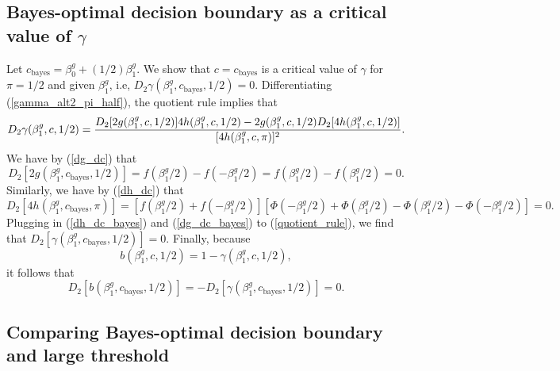 \documentclass[11pt]{article}
\begin{document}
\begin{appendices}
\begin{refsection}
\subsection{Bayes-optimal decision boundary as a critical value of $\gamma$}\label{sec:bayes_opt}
Let $c_\textrm{bayes} = \beta^g_0 + (1/2)\beta^g_1.$ We show that $c = c_\textrm{bayes}$ is a critical value of $\gamma$ for $\pi = 1/2$ and given $\beta^g_1$, i.e, $D_2 \gamma (\beta^g_1, c_\textrm{bayes}, 1/2) = 0.$ Differentiating (\ref{gamma_alt2_pi_half}), the quotient rule implies that
\begin{equation}\label{quotient_rule}
D_2\gamma(\beta^g_1, c, 1/2) \\ = \frac{D_2[2g(\beta^g_1, c, 1/2)] 4h(\beta^g_1, c, 1/2) - 2g(\beta^g_1, c, 1/2) D_2[4h(\beta^g_1, c, 1/2)]}{[4h(\beta^g_1, c, \pi)]^2}.
\end{equation}
We have by (\ref{dg_dc}) that
\begin{equation}\label{dg_dc_bayes}
D_2[2g(\beta^g_1, c_\textrm{bayes}, 1/2)] = f( \beta^g_1/2) - f( -\beta^g_1/2) = f(\beta^g_1/2) - f(\beta^g_1/2) = 0.
\end{equation}
Similarly, we have by (\ref{dh_dc}) that
\begin{equation}\label{dh_dc_bayes}
D_2[4 h(\beta^g_1, c_\textrm{bayes}, \pi)] = [f( \beta^g_1/2) + f( -\beta^g_1/2)] \left[  \Phi(-\beta^g_1/2) + \Phi(\beta^g_1/2) -  \Phi(\beta^g_1/2) - \Phi(-\beta^g_1/2) \right] = 0.
\end{equation}
Plugging in (\ref{dh_dc_bayes}) and (\ref{dg_dc_bayes}) to (\ref{quotient_rule}), we find that 
$D_2[\gamma(\beta^g_1, c_\textrm{bayes}, 1/2)] = 0.$ Finally, because
$$b(\beta^g_1, c, 1/2) = 1 - \gamma(\beta^g_1, c, 1/2),$$ it follows that
$$D_2[b(\beta^g_1, c_\textrm{bayes}, 1/2)] = -D_2[\gamma(\beta^g_1, c_\textrm{bayes}, 1/2)] = 0.$$

\subsection{Comparing Bayes-optimal decision boundary and large threshold}\label{sec:comparison}


\end{refsection}
\end{appendices}
\end{document}
